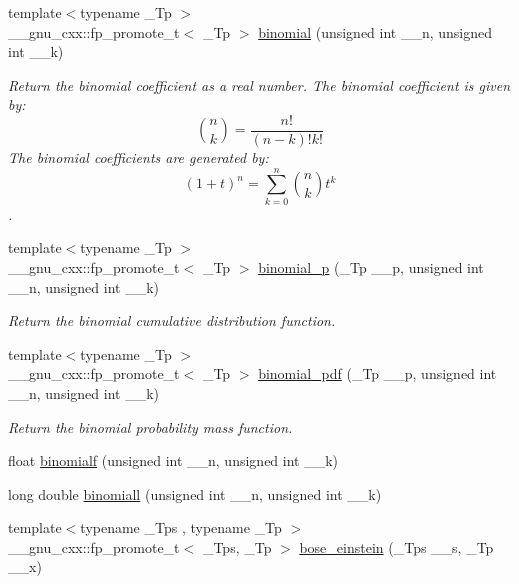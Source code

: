 \begin{DoxyCompactItemize}
\item 
{\footnotesize template$<$typename \+\_\+\+Tp $>$ }\\\+\_\+\+\_\+gnu\+\_\+cxx\+::fp\+\_\+promote\+\_\+t$<$ \+\_\+\+Tp $>$ \hyperlink{group__mathsf__gnu_gabd0cf6e3f1e1d36c4c45f118e34a5ca2}{binomial} (unsigned int \+\_\+\+\_\+n, unsigned int \+\_\+\+\_\+k)
\begin{DoxyCompactList}\small\item\em Return the binomial coefficient as a real number. The binomial coefficient is given by\+: \[ \binom{n}{k} = \frac{n!}{(n-k)! k!} \] The binomial coefficients are generated by\+: \[ \left(1 + t\right)^n = \sum_{k=0}^n \binom{n}{k} t^k \]. \end{DoxyCompactList}\item 
{\footnotesize template$<$typename \+\_\+\+Tp $>$ }\\\+\_\+\+\_\+gnu\+\_\+cxx\+::fp\+\_\+promote\+\_\+t$<$ \+\_\+\+Tp $>$ \hyperlink{group__mathsf__gnu_ga54276b9f03ad7b10e991b1681e0d2dd3}{binomial\+\_\+p} (\+\_\+\+Tp \+\_\+\+\_\+p, unsigned int \+\_\+\+\_\+n, unsigned int \+\_\+\+\_\+k)
\begin{DoxyCompactList}\small\item\em Return the binomial cumulative distribution function. \end{DoxyCompactList}\item 
{\footnotesize template$<$typename \+\_\+\+Tp $>$ }\\\+\_\+\+\_\+gnu\+\_\+cxx\+::fp\+\_\+promote\+\_\+t$<$ \+\_\+\+Tp $>$ \hyperlink{group__mathsf__gnu_gab726f5ed3181466baa0374e723ab5fb2}{binomial\+\_\+pdf} (\+\_\+\+Tp \+\_\+\+\_\+p, unsigned int \+\_\+\+\_\+n, unsigned int \+\_\+\+\_\+k)
\begin{DoxyCompactList}\small\item\em Return the binomial probability mass function. \end{DoxyCompactList}\item 
float \hyperlink{group__mathsf__gnu_ga3882a077dacc6e627ca48abc05d7db48}{binomialf} (unsigned int \+\_\+\+\_\+n, unsigned int \+\_\+\+\_\+k)
\item 
long double \hyperlink{group__mathsf__gnu_ga57602195f9215f735793c11d3210ac93}{binomiall} (unsigned int \+\_\+\+\_\+n, unsigned int \+\_\+\+\_\+k)
\item 
{\footnotesize template$<$typename \+\_\+\+Tps , typename \+\_\+\+Tp $>$ }\\\+\_\+\+\_\+gnu\+\_\+cxx\+::fp\+\_\+promote\+\_\+t$<$ \+\_\+\+Tps, \+\_\+\+Tp $>$ \hyperlink{group__mathsf__gnu_gae8135b6861a48f2cee2e692093a17102}{bose\+\_\+einstein} (\+\_\+\+Tps \+\_\+\+\_\+s, \+\_\+\+Tp \+\_\+\+\_\+x)

\end{DoxyCompactItemize}
